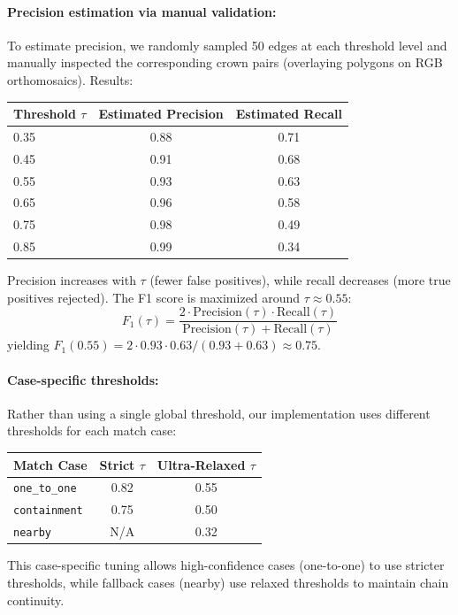 \paragraph{Precision estimation via manual validation:}
To estimate precision, we randomly sampled 50 edges at each threshold level and manually inspected the corresponding crown pairs (overlaying polygons on RGB orthomosaics). Results:
\begin{center}
\begin{tabular}{lcc}
\toprule
Threshold $\tau$ & Estimated Precision & Estimated Recall \\
\midrule
0.35 & 0.88 & 0.71 \\
0.45 & 0.91 & 0.68 \\
0.55 & 0.93 & 0.63 \\
0.65 & 0.96 & 0.58 \\
0.75 & 0.98 & 0.49 \\
0.85 & 0.99 & 0.34 \\
\bottomrule
\end{tabular}
\end{center}
Precision increases with $\tau$ (fewer false positives), while recall decreases (more true positives rejected). The F1 score is maximized around $\tau \approx 0.55$:
\[
F_1(\tau) = \frac{2 \cdot \text{Precision}(\tau) \cdot \text{Recall}(\tau)}{\text{Precision}(\tau) + \text{Recall}(\tau)}
\]
yielding $F_1(0.55) = 2 \cdot 0.93 \cdot 0.63 / (0.93 + 0.63) \approx 0.75$.

\paragraph{Case-specific thresholds:}
Rather than using a single global threshold, our implementation uses different thresholds for each match case:
\begin{center}
\begin{tabular}{lcc}
\toprule
Match Case & Strict $\tau$ & Ultra-Relaxed $\tau$ \\
\midrule
\texttt{one\_to\_one} & 0.82 & 0.55 \\
\texttt{containment} & 0.75 & 0.50 \\
\texttt{nearby} & N/A & 0.32 \\
\bottomrule
\end{tabular}
\end{center}
This case-specific tuning allows high-confidence cases (one-to-one) to use stricter thresholds, while fallback cases (nearby) use relaxed thresholds to maintain chain continuity.

